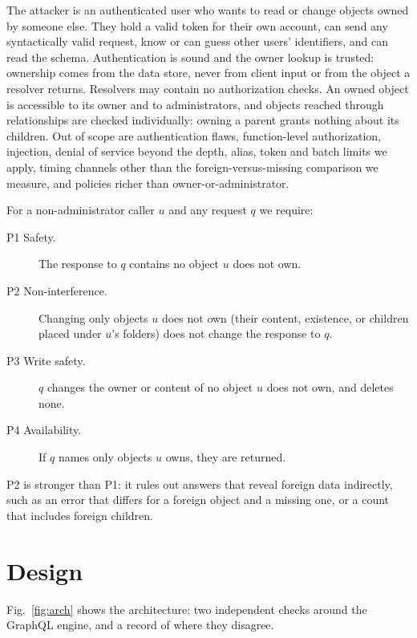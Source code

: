 \documentclass[conference]{IEEEtran}
\begin{document}
The attacker is an authenticated user who wants to read or change objects owned by someone else. They hold a valid token for their own account, can send any syntactically valid request, know or can guess other users' identifiers, and can read the schema. Authentication is sound and the owner lookup is trusted: ownership comes from the data store, never from client input or from the object a resolver returns. Resolvers may contain no authorization checks. An owned object is accessible to its owner and to administrators, and objects reached through relationships are checked individually: owning a parent grants nothing about its children. Out of scope are authentication flaws, function-level authorization, injection, denial of service beyond the depth, alias, token and batch limits we apply, timing channels other than the foreign-versus-missing comparison we measure, and policies richer than owner-or-administrator.

For a non-administrator caller $u$ and any request $q$ we require:
\begin{description}
\item[P1 Safety.] The response to $q$ contains no object $u$ does not own.
\item[P2 Non-interference.] Changing only objects $u$ does not own (their content, existence, or children placed under $u$'s folders) does not change the response to $q$.
\item[P3 Write safety.] $q$ changes the owner or content of no object $u$ does not own, and deletes none.
\item[P4 Availability.] If $q$ names only objects $u$ owns, they are returned.
\end{description}
P2 is stronger than P1: it rules out answers that reveal foreign data indirectly, such as an error that differs for a foreign object and a missing one, or a count that includes foreign children.

\section{Design}

Fig.~\ref{fig:arch} shows the architecture: two independent checks around the GraphQL engine, and a record of where they disagree.
\end{document}
